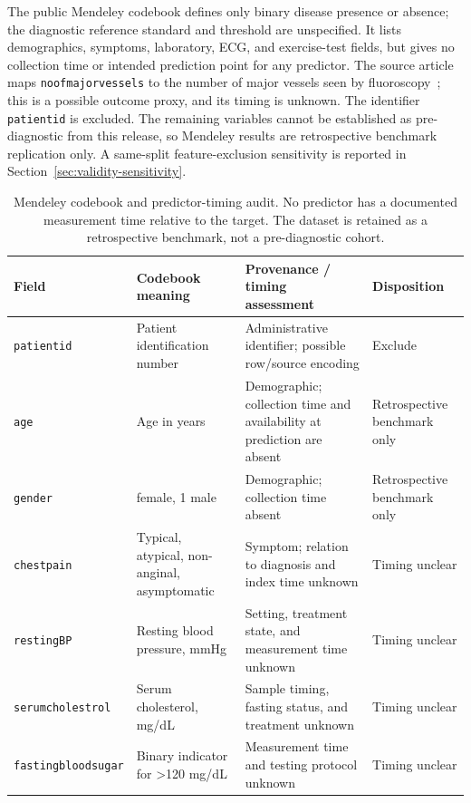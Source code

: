 \documentclass[12pt]{article}
\begin{document}
The public Mendeley codebook defines only binary disease presence or absence;
the diagnostic reference standard and threshold are unspecified. It lists
demographics, symptoms, laboratory, ECG, and exercise-test fields, but gives no
collection time or intended prediction point for any predictor. The source
article maps \texttt{noofmajorvessels} to the number of major vessels seen by
fluoroscopy~\cite{doppala2022ensemble}; this is a possible outcome proxy, and
its timing is unknown. The identifier \texttt{patientid} is excluded. The
remaining variables cannot be established as pre-diagnostic from this
release, so Mendeley results are retrospective benchmark replication only.
A same-split feature-exclusion sensitivity is reported in
Section~\ref{sec:validity-sensitivity}.

\begin{table}[t]
\centering
\caption{Mendeley codebook and predictor-timing audit. No predictor has a
documented measurement time relative to the target. The dataset is retained as
a retrospective benchmark, not a pre-diagnostic cohort.}
\label{tab:mendeley-provenance}
\scriptsize
\setlength{\tabcolsep}{3pt}
\begin{tabular}{@{}>{\raggedright\arraybackslash}p{2.0cm}>{\raggedright\arraybackslash}p{4.8cm}>{\raggedright\arraybackslash}p{6.1cm}>{\raggedright\arraybackslash}p{2.9cm}@{}}
\toprule
Field & Codebook meaning & Provenance / timing assessment & Disposition \\
\midrule
\texttt{patient\allowbreak id} & Patient identification number & Administrative identifier; possible row/source encoding & Exclude \\
\texttt{age} & Age in years & Demographic; collection time and availability at prediction are absent & Retrospective benchmark only \\
\texttt{gender} & 0 female, 1 male & Demographic; collection time absent & Retrospective benchmark only \\
\texttt{chest\allowbreak pain} & Typical, atypical, non-anginal, asymptomatic & Symptom; relation to diagnosis and index time unknown & Timing unclear \\
\texttt{restingBP} & Resting blood pressure, mmHg & Setting, treatment state, and measurement time unknown & Timing unclear \\
\texttt{serum\allowbreak cholestrol} & Serum cholesterol, mg/dL & Sample timing, fasting status, and treatment unknown & Timing unclear \\
\texttt{fasting\allowbreak blood\allowbreak sugar} & Binary indicator for >120 mg/dL & Measurement time and testing protocol unknown & Timing unclear \\

\end{tabular}
\end{table}
\end{document}
